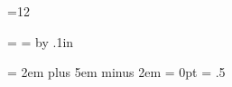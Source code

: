 


\def\newpage{\vfill\eject}

\def\biggg#1{{\hbox{$\left#1\vbox to20.5pt{}\right.$}}}
\def\bigggl{\mathopen\biggg}
\def\bigggr{\mathclose\biggg}
\def\Biggg#1{{\hbox{$\left#1\vbox to23.5pt{}\right.$}}}
\def\Bigggl{\mathopen\Biggg}
\def\Bigggr{\mathclose\Biggg}


=12	%


% 
\rm
\headline = {\hfil {\tenrm\folio} \hfil}
\footline = {}
\advance\vsize by .1in
\raggedbottom
\raggedright
\rightskip = 2em plus 5em minus 2em
\parindent = 0pt
\parskip = .5\baselineskip



